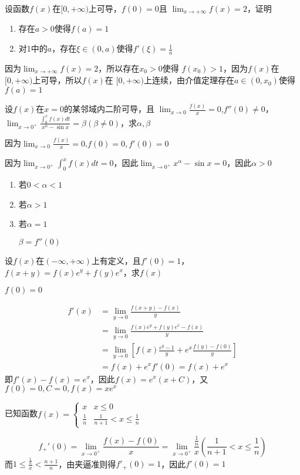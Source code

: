 \documentclass{article}
\begin{document}
\begin{examplle}[]
设函数\(f(x)\)在\([0,+\infty)\)上可导，\(f(0)=0\)且
\(\displaystyle\lim_{x\to+\infty}f(x)=2\)，证明
\begin{enumerate}
\item 存在\(a>0\)使得\(f(a)=1\)
\item 对1中的\(a\)，存在\(\xi\in(0,a)\)使得\(f'(\xi)=\frac{1}{a}\)
\end{enumerate}


因为\(\displaystyle\lim_{x\to+\infty}f(x)=2\)，所以存在\(x_0>0\)使得
\(f(x_0)>1\)，因为\(f(x)\)在\([0,+\infty)\)上可导，所以\(f(x)\)在
\([0,+\infty)\)上连续，由介值定理存在\(a\in(0,x_0)\)使得\(f(a)=1\)
\end{examplle}


\begin{examplle}[]
设\(f(x)\)在\(x=0\)的某邻域内二阶可导，且
\(\displaystyle\lim_{x\to0}\frac{f(x)}{x}=0\),\(f''(0)\neq0\)，
\(\displaystyle\lim_{x\to0^+}\frac{\int_0^xf(x)dt}{x^\alpha-\sin x}=\beta(\beta\neq0)\)，求\(\alpha,\beta\)

因为\(\lim_{x\to0}\frac{f(x)}{x}=0\),\(f(0)=0,f'(0)=0\)

因为\(\lim_{x\to0^+}\int_0^xf(x)dt=0\)，因此\(\lim_{x\to0^+}x^\alpha-\sin
  x=0\)，因此\(\alpha>0\)
\begin{enumerate}
\item 若\(0<\alpha<1\)
\item 若\(\alpha>1\)
\item 若\(\alpha=1\)

\(\beta=f''(0)\)
\end{enumerate}
\end{examplle}

\begin{examplle}[]
设\(f(x)\)在\((-\infty,+\infty)\)上有定义，且\(f'(0)=1\)，
\(f(x+y)=f(x)e^y+f(y)e^x\)，求\(f(x)\)

\(f(0)=0\)

\begin{align*}
f'(x)&=\lim_{y\to0}\frac{f(x+y)-f(x)}{y}\\
&=\lim_{y\to0}\frac{f(x)e^y+f(y)e^x-f(x)}{y}\\
&=\lim_{y\to0}\left[
f(x)\frac{e^y-1}{y}+e^x\frac{f(y)-f(0)}{y}
\right]\\
&=f(x)+e^xf'(0)=f(x)+e^x
\end{align*}
即\(f'(x)-f(x)=e^x\)，因此\(f(x)=e^x(x+C)\)，又\(f(0)=0,C=0,f(x)=xe^x\)
\end{examplle}

\begin{examplle}[]
已知函数\(\displaystyle f(x)=\begin{cases}x&x\le0\\\frac{1}{n}&\frac{1}{n+1}
  <x\le\frac{1}{n}\end{cases}\)

\begin{equation*}
f_+'(0)=\lim_{x\to0^+}\frac{f(x)-f(0)}{x}=\lim_{x\to0^+}\frac{\frac{1}{n}}{x}
\left(\frac{1}{n+1}<x\le\frac{1}{n}
\right)
\end{equation*}
而\(1\le\frac{\frac{1}{n}}{x}<\frac{n+1}{n}\)，由夹逼准则得\(f'_+(0)=1\)，因此\(f'(0)=1\)
\end{examplle}
\end{document}
